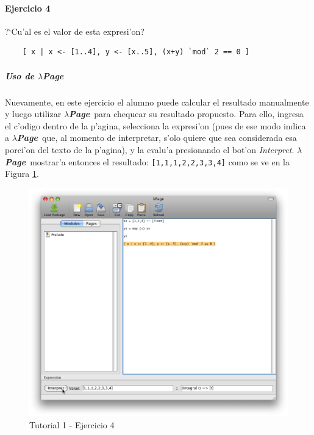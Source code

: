 \documentclass[a4paper]{article}
\newcommand{\hpage}{\textbf{\textsl{$\lambda$Page}}}
\begin{document}
\paragraph{Ejercicio 4}?`Cu'al es el valor de esta expresi'on?
\lstset{language=haskell, frame=single, tabsize=4}
\begin{center}\begin{lstlisting}
	[ x | x <- [1..4], y <- [x..5], (x+y) `mod` 2 == 0 ]
\end{lstlisting}\end{center}
\subparagraph{Uso de \hpage}Nuevamente, en este ejercicio el alumno puede calcular el resultado manualmente y luego utilizar \hpage\ para chequear su resultado propuesto.  Para ello, ingresa el c'odigo dentro de la p'agina, selecciona la expresi'on (pues de ese modo indica a \hpage\ que, al momento de interpretar, s'olo quiere que sea considerada esa porci'on del texto de la p'agina), y la evalu'a presionando el bot'on \textsl{Interpret}.  \hpage\ mostrar'a entonces el resultado: \texttt{[1,1,1,2,2,3,3,4]} como se ve en la Figura \ref{tut102}.
\begin{figure}[hp]
	\begin{center}
        	\includegraphics[width=.75\textwidth]{pictures/tut1/02}
		\caption{Tutorial 1 - Ejercicio 4}
		\label{tut102}
	\end{center}
\end{figure}
\end{document}
